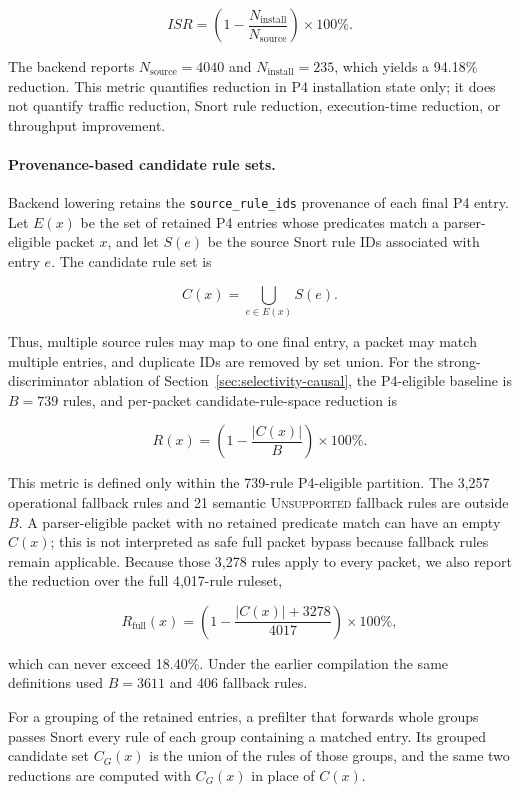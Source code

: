 \documentclass{article}
\begin{document}
\[
ISR = \left(1 - \frac{N_{\mathrm{install}}}{N_{\mathrm{source}}}\right)
\times 100\%.
\]

The backend reports $N_{\mathrm{source}}=4040$ and $N_{\mathrm{install}}=235$,
which yields a 94.18\% reduction. This metric quantifies reduction in P4 installation state only; it does not
quantify traffic reduction, Snort rule reduction, execution-time reduction,
or throughput improvement.

\paragraph{Provenance-based candidate rule sets.}\leavevmode\par
Backend lowering retains
the \texttt{source\_\allowbreak rule\_\allowbreak ids} provenance of each final P4 entry. Let
$E(x)$ be the set of retained P4 entries whose predicates match a
parser-eligible packet $x$, and let $S(e)$ be the source Snort rule IDs
associated with entry $e$. The candidate rule set is

\[
C(x) = \bigcup_{e \in E(x)} S(e).
\]

Thus, multiple source rules may map to one final entry, a packet may match
multiple entries, and duplicate IDs are removed by set union. For the
strong-discriminator ablation of Section~\ref{sec:selectivity-causal}, the
P4-eligible baseline is $B=739$ rules, and per-packet candidate-rule-space
reduction is

\[
R(x) = \left(1 - \frac{|C(x)|}{B}\right) \times 100\%.
\]

This metric is defined only within the 739-rule P4-eligible partition.
The 3,257 operational fallback rules and 21 semantic \textsc{Unsupported}
fallback rules are outside $B$. A parser-eligible packet with no retained
predicate match can have an empty $C(x)$; this is not interpreted as safe
full packet bypass because fallback rules remain applicable. Because those
3,278 rules apply to every packet, we also report the reduction over the full
4,017-rule ruleset,

\[
R_{\mathrm{full}}(x) = \left(1 - \frac{|C(x)| + 3278}{4017}\right) \times 100\%,
\]

which can never exceed 18.40\%. Under the earlier compilation the same
definitions used $B=3611$ and 406 fallback rules.

For a grouping of the retained entries, a prefilter that forwards whole
groups passes Snort every rule of each group containing a matched entry. Its
grouped candidate set $C_G(x)$ is the union of the rules of those groups, and
the same two reductions are computed with $C_G(x)$ in place of $C(x)$.
\end{document}
